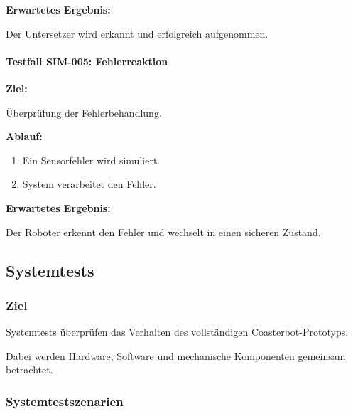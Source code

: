 \documentclass[
  a4paper,
  12pt,
  DIV=12,        %
  parskip=half,  %
  headings=small %
]{scrartcl}
\theoremstyle{definition}
\providecommand{\tightlist}{%
  \setlength{\itemsep}{0pt}\setlength{\parskip}{0pt}}
\theoremstyle{definition}
\begin{document}
\textbf{Erwartetes Ergebnis:}

Der Untersetzer wird erkannt und erfolgreich aufgenommen.

\paragraph{Testfall SIM-005:
Fehlerreaktion}\label{testfall-sim-005-fehlerreaktion}

\textbf{Ziel:}

Überprüfung der Fehlerbehandlung.

\textbf{Ablauf:}

\begin{enumerate}
\def\labelenumi{\arabic{enumi}.}
\tightlist
\item
  Ein Sensorfehler wird simuliert.
\item
  System verarbeitet den Fehler.
\end{enumerate}

\textbf{Erwartetes Ergebnis:}

Der Roboter erkennt den Fehler und wechselt in einen sicheren Zustand.

\subsection{Systemtests}\label{systemtests-1}

\subsubsection{Ziel}\label{ziel-3}

Systemtests überprüfen das Verhalten des vollständigen
Coasterbot-Prototyps.

Dabei werden Hardware, Software und mechanische Komponenten gemeinsam
betrachtet.

\subsubsection{Systemtestszenarien}\label{systemtestszenarien}
\end{document}
